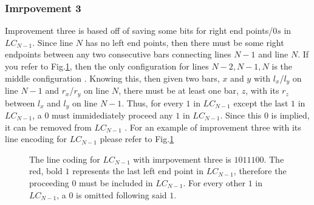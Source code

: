 \subsubsection{Imrpovement 3}
Improvement three is based off of saving some bits for right 
end points/$0s$ in $LC_{N-1}$. Since line $N$ has no left end points,
then there must be some right endpoints between any two 
consecutive bars connecting lines $N-1$ and line $N$. If you 
refer to Fig.\ref{fig:improvement3}, then the only configuration for lines $N-2, N-1, N$
is the middle configuration \cite{A5}. Knowing this, then 
given two bars, $x$ and $y$ with $l_{x}$/$l_{y}$ on line 
$N-1$ and $r_{x}$/$r_{y}$ on line $N$, there must be at least 
one bar, $z$, with its $r_{z}$ between $l_{x}$ and $l_{y}$
on line $N-1$. Thus, for every $1$ in $LC_{N-1}$ except the 
last $1$ in $LC_{N-1}$, a $0$ must immidediately proceed any $1$
in $LC_{N-1}$. Since this $0$ is implied, it can be removed from $LC_{N-1}$ \cite{A5}. 
For an example of improvement three with its line encoding for $LC_{N-1}$ please refer to Fig.\ref{fig:improvement3}\pagebreak
\begin{figure}[!htp]
    \centering
    \caption{The line coding for $LC_{N-1}$ with imrpovement three is $101110$\underline{$0$}. The red, bold $1$ represents 
    the last left end point in $LC_{N-1}$, therefore the proceeding $0$ must be 
    included in $LC_{N-1}$. For every other $1$ in $LC_{N-1}$, a $0$ is omitted following 
    said $1$.}
    \label{fig:improvement3}
\end{figure}
